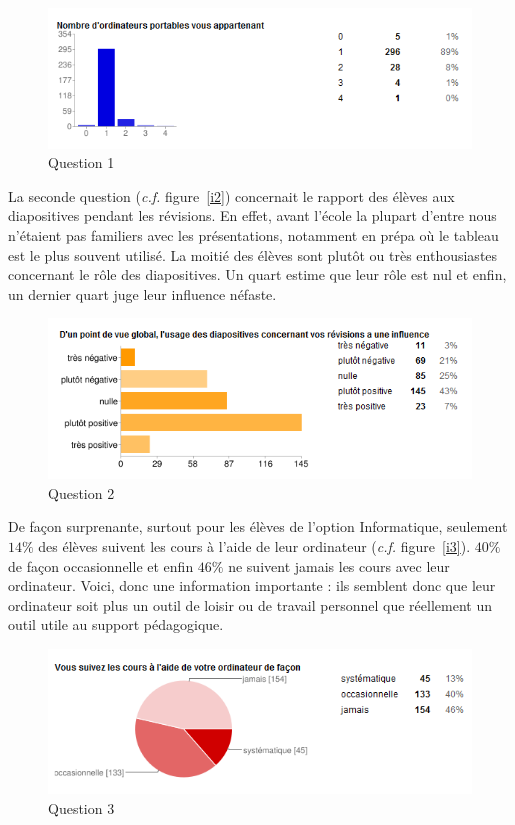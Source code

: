 \documentclass[a4paper,11pt,french]{report}
\begin{document}
\begin{figure}[h!]
\includegraphics[width=\textwidth]{i1.PNG}
\caption{Question 1}
\label{i1}
\end{figure}

La seconde question (\textit{c.f.} figure~\vref{i2}) concernait le rapport des élèves aux diapositives pendant les révisions. En effet, avant l’école la plupart d’entre nous n'étaient pas familiers avec les présentations, notamment en prépa où le tableau est le plus souvent utilisé. La moitié des élèves sont plutôt ou très enthousiastes concernant le rôle des diapositives. Un quart estime que leur rôle est nul et enfin, un dernier quart juge leur influence néfaste.\\

\begin{figure}[h!]
\includegraphics[width=\textwidth]{i2.PNG}
\caption{Question 2}
\label{i2}
\end{figure}


De façon surprenante, surtout pour les élèves de l’option Informatique, seulement $14\%$ des élèves suivent les cours à l’aide de leur ordinateur (\textit{c.f.} figure~\vref{i3}). $40\%$ de façon occasionnelle et enfin $46\%$ ne suivent jamais les cours avec leur ordinateur. Voici, donc une information importante : ils semblent donc que leur ordinateur soit plus un outil de loisir ou de travail personnel que réellement un outil utile au support pédagogique.

\begin{figure}[h!]
\includegraphics[width=\textwidth]{i3.PNG}
\caption{Question 3}
\label{i3}
\end{figure}
\end{document}
